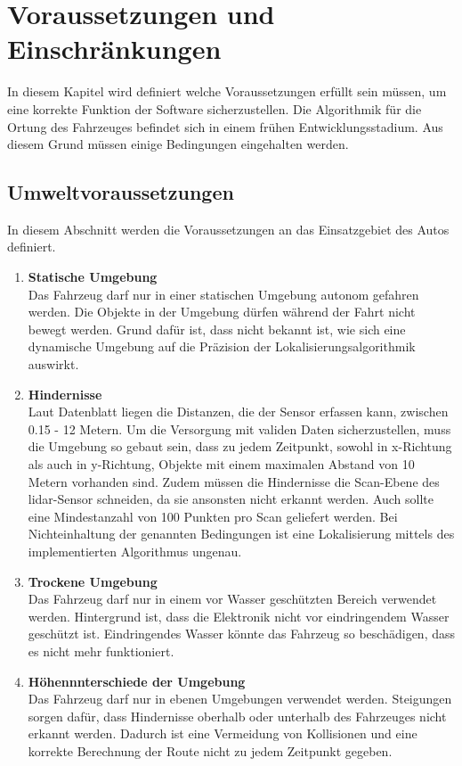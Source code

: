 \section{Voraussetzungen und Einschränkungen}
\label{umwelt}
In diesem Kapitel wird definiert welche Voraussetzungen erfüllt sein müssen, um eine korrekte Funktion der Software sicherzustellen.
Die Algorithmik für die Ortung des Fahrzeuges befindet sich in einem frühen Entwicklungsstadium. 
Aus diesem Grund müssen einige Bedingungen eingehalten werden. 

\subsection{Umweltvoraussetzungen}
In diesem Abschnitt werden die Voraussetzungen an das Einsatzgebiet des Autos definiert.

\begin{enumerate}[leftmargin=*]
    \item \textbf{Statische Umgebung} \\
    Das Fahrzeug darf nur in einer statischen Umgebung autonom gefahren werden. 
    Die Objekte in der Umgebung dürfen während der Fahrt nicht bewegt werden.
    Grund dafür ist, dass nicht bekannt ist, wie sich eine dynamische Umgebung auf die Präzision der Lokalisierungsalgorithmik auswirkt. 
    
    \item \textbf{Hindernisse} \\
    Laut Datenblatt \cite{Slamtec2020} liegen die Distanzen, die der Sensor erfassen kann, zwischen 0.15 - 12 Metern.
    Um die Versorgung mit validen Daten sicherzu\-stellen, muss die Umgebung so gebaut sein, 
    dass zu jedem Zeitpunkt, sowohl in x-Richtung als auch in y-Richtung, Objekte mit einem maximalen Abstand von 10 Metern vorhanden sind.
    Zudem müssen die Hindernisse die Scan-Ebene des \ac{lidar}-Sensor schneiden, da sie ansonsten nicht erkannt werden.
    Auch sollte eine Mindestanzahl von 100 Punkten pro Scan geliefert werden.
    Bei Nichteinhaltung der genannten Bedingungen ist eine Lokalisierung mittels des implementierten Algorithmus ungenau.
    
    \item \textbf{Trockene Umgebung} \\
    Das Fahrzeug darf nur in einem vor Wasser geschützten Bereich verwendet werden.
    Hintergrund ist, dass die Elektronik nicht vor eindringendem Wasser geschützt ist.
    Eindringendes Wasser könnte das Fahrzeug so beschädigen, dass es nicht mehr funktioniert.
   
    \item \textbf{Höhennnterschiede der Umgebung} \\
    Das Fahrzeug darf nur in ebenen Umgebungen verwendet werden. 
    Steigungen sorgen dafür, dass Hindernisse oberhalb oder unterhalb des Fahrzeuges nicht erkannt werden. Dadurch ist eine Vermeidung von Kollisionen 
    und eine korrekte Berechnung der Route nicht zu jedem Zeitpunkt gegeben.
\end{enumerate}

